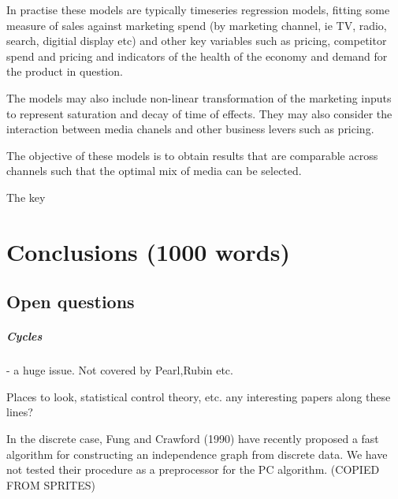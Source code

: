 \documentclass[11pt,a4paper,oneside]{book}
\begin{document}
In practise these models are typically timeseries regression models, fitting some measure of sales against marketing spend (by marketing channel, ie TV, radio, search, digitial display etc) and other key variables such as pricing, competitor spend and pricing and indicators of the health of the economy and demand for the product in question.

The models may also include non-linear transformation of the marketing inputs to represent saturation and decay of time of effects. They may also consider the interaction between media chanels and other business levers such as pricing.  

The objective of these models is to obtain results that are comparable across channels such that the optimal mix of media can be selected. 

The key

\chapter*{Conclusions (1000 words)}

\section*{Open questions}
\paragraph{Cycles} - a huge issue. Not covered by Pearl,Rubin etc. 

Places to look, statistical control theory, etc. any interesting papers along these lines?

In the discrete case,
Fung and Crawford (1990) have recently proposed a fast algorithm for constructing an
independence graph from discrete data. We have not tested their procedure as a preprocessor for
the PC algorithm. (COPIED FROM SPRITES)


\end{document}
